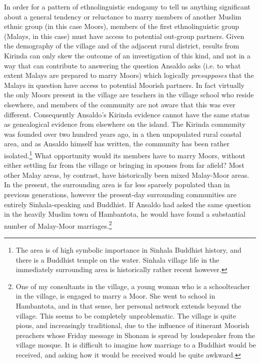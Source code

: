 In order for a pattern of ethnolinguistic endogamy to tell us anything significant about a general tendency or reluctance to marry members of another Muslim ethnic group (in this case Moors), members of the first ethnolinguistic group (Malays, in this case) must have access to potential out-group partners. Given the demography of the village and of the adjacent rural district, results from Kirinda can only skew the outcome of an investigation of this kind, and not in a way that can contribute to answering the question Ansaldo asks (i.e. to what extent Malays are prepared to marry Moors) which logically \textit{presupposes} that the Malays in question have access to potential Moorish partners. In fact virtually the only Moors present in the village are teachers in the village school who reside elsewhere, and members of the community are not aware that this was ever different. Consequently Ansaldo's Kirinda evidence cannot have the same status as genealogical evidence from elsewhere on the island. The Kirinda community was founded over two hundred years ago, in a then unpopulated rural coastal area, and as Ansaldo himself has written, the community has been rather isolated.\footnote{The
  area is of high symbolic importance in Sinhala Buddhist history, and there is a Buddhist temple on the water. Sinhala village life in the immediately surrounding area is historically rather recent however.
} What opportunity would its members have to marry Moors, without either settling far from the village or bringing in spouses from far afield? Most other Malay areas, by contrast, have historically been mixed Malay-Moor areas. In the present, the surrounding area is far less sparsely populated than in previous generations, however the present-day surrounding communities are entirely Sinhala-speaking and Buddhist.  If Ansaldo had asked the same question in the heavily Muslim town of Hambantota, he would have found a substantial number of Malay-Moor marriages.\footnote{One
  of my consultants in the village, a young woman who is a schoolteacher in the village, is engaged to marry a Moor. She went to school in Hambantota, and in that sense, her personal network extends beyond the village. This seems to be completely unproblematic. The village is quite pious, and increasingly traditional, due to the influence of itinerant Moorish preachers whose Friday message in Shonam is spread by loudspeaker from the village mosque. It is difficult to imagine how marriage to a Buddhist would be received, and asking how it would be received would be quite awkward.
}

